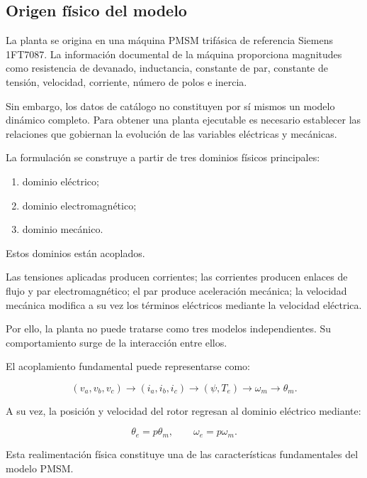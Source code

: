 \subsection{Origen físico del modelo}

La planta se origina en una máquina PMSM trifásica de referencia Siemens 1FT7087. La información documental de la máquina proporciona magnitudes como resistencia de devanado, inductancia, constante de par, constante de tensión, velocidad, corriente, número de polos e inercia.

Sin embargo, los datos de catálogo no constituyen por sí mismos un modelo dinámico completo. Para obtener una planta ejecutable es necesario establecer las relaciones que gobiernan la evolución de las variables eléctricas y mecánicas.

La formulación se construye a partir de tres dominios físicos principales:

\begin{enumerate}
    \item dominio eléctrico;
    \item dominio electromagnético;
    \item dominio mecánico.
\end{enumerate}

Estos dominios están acoplados.

Las tensiones aplicadas producen corrientes; las corrientes producen enlaces de flujo y par electromagnético; el par produce aceleración mecánica; la velocidad mecánica modifica a su vez los términos eléctricos mediante la velocidad eléctrica.

Por ello, la planta no puede tratarse como tres modelos independientes. Su comportamiento surge de la interacción entre ellos.

El acoplamiento fundamental puede representarse como:

\begin{equation}
(v_a,v_b,v_c)
\rightarrow
(i_a,i_b,i_c)
\rightarrow
(\psi,T_e)
\rightarrow
\omega_m
\rightarrow
\theta_m.
\end{equation}

A su vez, la posición y velocidad del rotor regresan al dominio eléctrico mediante:

\begin{equation}
\theta_e=p\theta_m,
\qquad
\omega_e=p\omega_m.
\end{equation}

Esta realimentación física constituye una de las características fundamentales del modelo PMSM.

